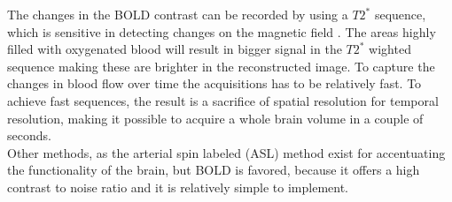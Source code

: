 The changes in the BOLD contrast can be recorded by using a $T2^*$ sequence, which is sensitive in detecting changes on the magnetic field \cite{Khanna2015,Lee2002}. The areas highly filled with oxygenated blood will result in bigger signal in the $T2^*$ wighted sequence making these are brighter in the reconstructed image. To capture the changes in blood flow over time the acquisitions has to be relatively fast. To achieve fast sequences, the result is a sacrifice of spatial resolution for temporal resolution, making it possible to acquire a whole brain volume in a couple of seconds. \cite{Khanna2015} \\ 
Other methods, as the arterial spin labeled (ASL) method exist for accentuating the functionality of the brain, but BOLD is favored, because it offers a high contrast to noise ratio and it is relatively simple to implement. \cite{Lee2002}    
